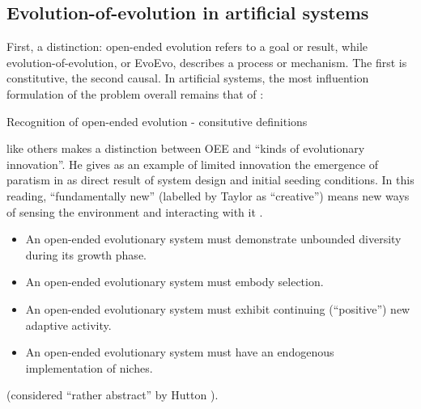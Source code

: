 \subsection{Evolution-of-evolution in artificial systems}

First, a distinction: open-ended evolution refers to a goal or result, while evolution-of-evolution, or EvoEvo, describes a process or mechanism. The first is constitutive, the second causal. In artificial systems, the most influention formulation of the problem overall remains that of \cite{Bedau:2000mi}:



Recognition of open-ended evolution - consitutive definitions

\autocite{Taylor2001} like others makes a distinction between OEE and ``kinds of evolutionary innovation''. He gives as an example of limited innovation the emergence of paratism in \cite{Ray1991} as direct result of system design and initial seeding conditions. In this reading, ``fundamentally new'' (labelled by Taylor as ``creative'') means new ways of sensing the environment and interacting with it \cite{Taylor2001}.


\begin{itemize}
	\item An open-ended evolutionary system must demonstrate unbounded diversity during its growth phase.
	\item An open-ended evolutionary system must embody selection.
	\item An open-ended evolutionary system must exhibit continuing (``positive'') new adaptive activity.
	\item An open-ended evolutionary system must have an endogenous implementation of niches.
\end{itemize} \cite{Maley1999} (considered ``rather abstract'' by Hutton \parencite[p.341]{Hutton2002}).

